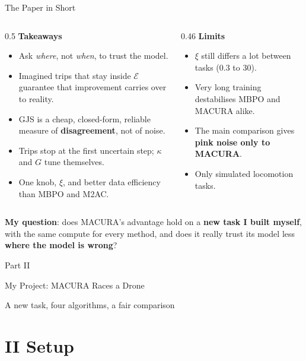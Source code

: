 \documentclass[aspectratio=169,10pt]{beamer}
\newcommand{\partslide}[3]{%
  \begin{frame}[plain]
    \vfill\centering
    {\large Part #1}\par\vspace{1.0em}
    {\usebeamerfont{title}\color{navy}#2\par}\vspace{1.0em}
    {\normalsize #3\par}
    \vfill
  \end{frame}}
\newcommand{\E}{\mathcal{E}}
\begin{document}
\begin{frame}{The Paper in Short}
  \begin{columns}[T]
    \begin{column}{0.5\textwidth}
      \textbf{Takeaways}
      \begin{itemize}\small
        \item Ask \emph{where}, not \emph{when}, to trust the model.
        \item Imagined trips that stay inside $\E$ guarantee that improvement carries over to reality.
        \item GJS is a cheap, closed-form, reliable measure of \textbf{disagreement}, not of noise.
        \item Trips stop at the first uncertain step; $\kappa$ and $G$ tune themselves.
        \item One knob, $\xi$, and better data efficiency than MBPO and M2AC.
      \end{itemize}
    \end{column}
    \begin{column}{0.46\textwidth}
      \textbf{Limits}
      \begin{itemize}\small
        \item $\xi$ still differs a lot between tasks (0.3 to 30).
        \item Very long training destabilises MBPO and MACURA alike.
        \item The main comparison gives \textbf{pink noise only to MACURA}.
        \item Only simulated locomotion tasks.
      \end{itemize}
    \end{column}
  \end{columns}
  \vspace{1em}
  \centering
  \colorbox{myblue!10}{\parbox{0.9\linewidth}{\centering\small
    \textbf{My question}: does MACURA's advantage hold on a \textbf{new task I built myself}, with the same compute
    for every method, and does it really trust its model less \textbf{where the model is wrong}?}}
\end{frame}

\partslide{II}{My Project: MACURA Races a Drone}{A new task, four algorithms, a fair comparison}
\section{II \textperiodcentered{} Setup}
\end{document}
